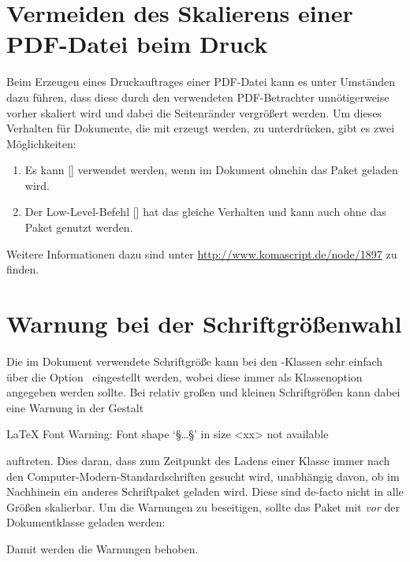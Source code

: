 \section{Vermeiden des Skalierens einer PDF-Datei beim Druck}
%
Beim Erzeugen eines Druckauftrages einer PDF-Datei kann es unter Umständen dazu 
führen, dass diese durch den verwendeten PDF-Betrachter unnötigerweise vorher 
skaliert wird und dabei die Seitenränder vergrößert werden. Um dieses Verhalten 
für Dokumente, die mit  erzeugt werden, zu unterdrücken, gibt es 
zwei Möglichkeiten:
%
\begin{enumerate}
\item Es kann [] verwendet 
  werden, wenn im Dokument ohnehin das Paket  geladen wird.
\item Der Low-Level-Befehl
  []
  hat das gleiche Verhalten und kann auch ohne das Paket  
  genutzt werden.
\end{enumerate}
%
Weitere Informationen dazu sind unter \url{http://www.komascript.de/node/1897} 
zu finden.


\section{Warnung bei der Schriftgrößenwahl}
%
Die im Dokument verwendete Schriftgröße kann bei den \KOMAScript-Klassen sehr 
einfach über die Option~ eingestellt werden, wobei diese immer 
als Klassenoption angegeben werden sollte. Bei relativ großen und kleinen 
Schriftgrößen kann dabei eine Warnung in der Gestalt 
%
\begin{quoting}
\begin{Code}[escapechar=§]
LaTeX Font Warning: Font shape `§\dots§' in size <xx> not available
\end{Code}
\end{quoting}
%
auftreten. Dies daran, dass zum Zeitpunkt des Ladens einer Klasse immer nach 
den Computer-Modern-Standardschriften gesucht wird, unabhängig davon, ob im 
Nachhinein ein anderes Schriftpaket geladen wird. Diese sind de-facto nicht in 
alle Größen skalierbar. Um die Warnungen zu beseitigen, sollte das Paket 
 mit  \emph{vor} der Dokumentklasse 
geladen werden: 
\begin{quoting}[rightmargin=0pt]
\end{quoting}
%
Damit werden die Warnungen behoben.


